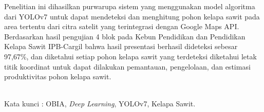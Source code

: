 \begin{singlespace}
Penelitian ini dihasilkan purwarupa sistem yang menggunakan model algoritma dari YOLOv7 untuk dapat mendeteksi dan menghitung pohon kelapa sawit pada area tertentu dari citra satelit yang terintegrasi dengan Google Maps API. Berdasarkan hasil pengujian 4 blok pada Kebun Pendidikan dan Pendidikan Kelapa Sawit IPB-Cargil bahwa hasil presentasi berhasil dideteksi sebesar 97,67\%, dan diketahui setiap pohon kelapa sawit yang terdeteksi diketahui letak titik koordinat untuk dapat dilakukan pemantauan, pengelolaan, dan estimasi produktivitas pohon kelapa sawit.

\end{singlespace}
\noindent \\

\noindent Kata kunci : OBIA, \textit{Deep Learning}, YOLOv7, Kelapa Sawit.